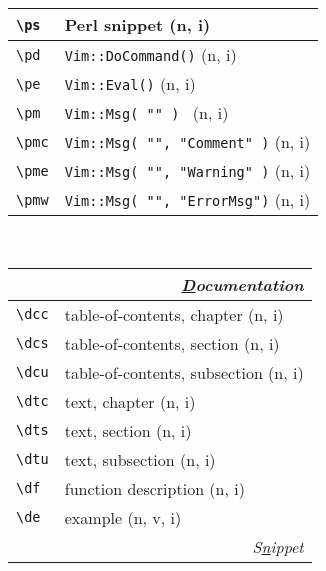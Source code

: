 \documentclass[oneside,10pt,landscape,DIV16]{scrartcl}
\begin{document}
\begin{multicols}{3}
\begin{center}
\begin{tabular}[]{|p{11mm}|p{58mm}|}
\hline \verb'\ps'   & Perl snippet \hfill (n, i)\\
\hline \verb'\pd'   & \texttt{Vim::DoCommand()} \hfill (n, i)\\
\hline \verb'\pe'   & \texttt{Vim::Eval()} \hfill (n, i)\\
\hline \verb'\pm'   & \texttt{Vim::Msg( "" )           } \hfill (n, i)\\
\hline \verb'\pmc'  & \texttt{Vim::Msg( "", "Comment" )} \hfill (n, i)\\
\hline \verb'\pme'  & \texttt{Vim::Msg( "", "Warning" )} \hfill (n, i)\\
\hline \verb'\pmw'  & \texttt{Vim::Msg( "", "ErrorMsg")} \hfill (n, i)\\
\hline
\end{tabular}\\
%
%
\begin{tabular}[]{|p{11mm}|p{58mm}|}
\hline
\multicolumn{2}{|r|}{\textsl{\underline{D}ocumentation}}                 \\[1.0ex]
\hline \verb'\dcc' & table-of-contents, chapter    \hfill (n, i)\\
\hline \verb'\dcs' & table-of-contents, section    \hfill (n, i)\\
\hline \verb'\dcu' & table-of-contents, subsection \hfill (n, i)\\
\hline \verb'\dtc' & text, chapter                 \hfill (n, i)\\
\hline \verb'\dts' & text, section                 \hfill (n, i)\\
\hline \verb'\dtu' & text, subsection              \hfill (n, i)\\
\hline \verb'\df'  & function description          \hfill (n, i)\\
\hline \verb'\de'  & example                       \hfill (n, v, i)\\
\hline
\hline
\multicolumn{2}{|r|}{\textsl{S\underline{n}ippet}}                \\[1.0ex]

\end{tabular}
\end{center}
\end{multicols}
\end{document}
